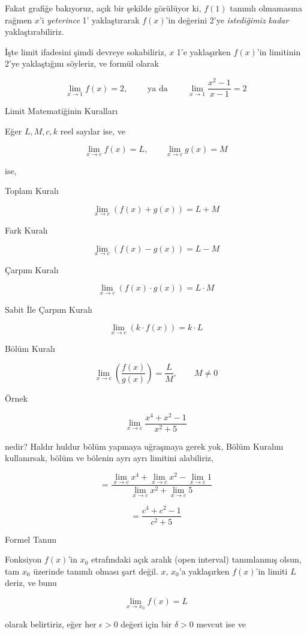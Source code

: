 \documentclass[12pt,fleqn]{article}\usepackage{../../common}
\begin{document}
Fakat grafiğe bakıyoruz, açık bir şekilde görülüyor ki, $f(1)$ tanımlı
olmamasına rağmen $x$'i {\em yeterince} 1' yaklaştırarak $f(x)$'in değerini
2'ye {\em istediğimiz kadar} yaklaştırabiliriz. 

İşte limit ifadesini şimdi devreye sokabiliriz, $x$ 1'e yaklaşırken
$f(x)$'in limitinin 2'ye yaklaştığını söyleriz, ve formül olarak

$$ \lim_{x \to 1} f(x) = 2 , \qquad \textrm { ya da } \qquad
\lim_{x \to 1} \frac{x^2 - 1}{x-1} = 2
$$

Limit Matematiğinin Kuralları

Eğer $L,M,c,k$ reel sayılar ise, ve

$$ \lim_{x \to c} f(x) = L, \qquad \lim_{x \to c} g(x) = M $$

ise, 

Toplam Kuralı

$$ \lim_{x \to c} ( f(x)+g(x) ) = L + M  $$

Fark Kuralı

$$ \lim_{x \to c} ( f(x)-g(x) ) = L - M  $$

Çarpım Kuralı

$$ \lim_{x \to c} ( f(x) \cdot g(x) ) = L \cdot M  $$

Sabit İle Çarpım Kuralı

$$ \lim_{x \to c} ( k \cdot f(x) ) = k \cdot L  $$

Bölüm Kuralı

$$ \lim_{x \to c} ( \frac{f(x)}{g(x)} ) = \frac{L}{M}, \qquad M \ne 0  $$

Örnek

$$ \lim_{x \to c} \frac{x^4 + x^2 - 1}{x^2 + 5} $$

nedir? Haldır huldur bölüm yapmaya uğraşmaya gerek yok, Bölüm Kuralını
kullanırsak, bölüm ve bölenin ayrı ayrı limitini alabiliriz,

$$ = \frac{\lim_{x \to c} x^4 + \lim_{x \to c} x^2 - \lim_{x \to c} 1}
{\lim_{x \to c} x^2 + \lim_{x \to c} 5} 
$$

$$ = \frac{c^4 + c^2 - 1}{c^2 + 5} $$

Formel Tanım

Fonksiyon $f(x)$'in $x_0$ etrafındaki açık aralık (open interval)
tanımlanmış olsun, tam $x_0$ üzerinde tanımlı olması şart değil. $x$,
$x_0$'a yaklaşırken $f(x)$'in limiti $L$ deriz, ve bunu 

$$ \lim_{x \to x_0} f(x) = L $$

olarak belirtiriz, eğer her $\epsilon > 0$ değeri için bir $\delta > 0$
mevcut ise ve
\end{document}
